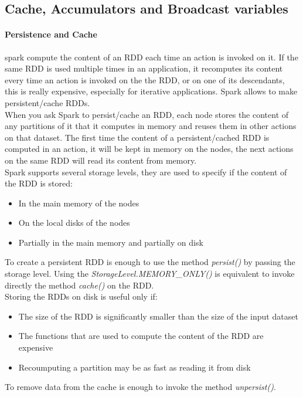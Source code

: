\documentclass[12pt]{article}
\begin{document}
\subsection{Cache, Accumulators and Broadcast variables}
\paragraph{Persistence and Cache} spark compute the content of an RDD each time an action is invoked on it. If the same RDD is used multiple times in an application, it recomputes its content every time an action is invoked on the the RDD, or on one of its descendants, this is really expensive, especially for iterative applications. Spark allows to make persistent/cache RDDs.\\
When you ask Spark to persist/cache an RDD, each node stores the content of any partitions of it that it computes in memory and reuses them in other actions on that dataset. The first time the content of a persistent/cached RDD is computed in an action, it will be kept in memory on the nodes, the next actions on the same RDD will read its content from memory.\\
Spark supports several storage levels, they are used to specify if the content of the RDD is stored:
\begin{itemize}
  \item In the main memory of the nodes
  \item On the local disks of the nodes
  \item Partially in the main memory and partially on disk
\end{itemize}
To create a persistent RDD is enough to use the method \textit{persist()} by passing the storage level. Using the \textit{StorageLevel.MEMORY\_ONLY()} is equivalent to invoke directly the method \textit{cache()} on the RDD.\\
Storing the RDDs on disk is useful only if:
\begin{itemize}
  \item The size of the RDD is significantly smaller than the size of the input dataset
  \item The functions that are used to compute the content of the RDD are expensive
  \item Recoumputing a partition may be as fast as reading it from disk
\end{itemize}
To remove data from the cache is enough to invoke the method \textit{unpersist()}.
\end{document}
